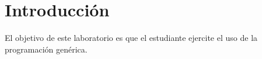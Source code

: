 \section{Introducción}

El objetivo de este laboratorio es que el estudiante ejercite el 
uso de la programación genérica.
